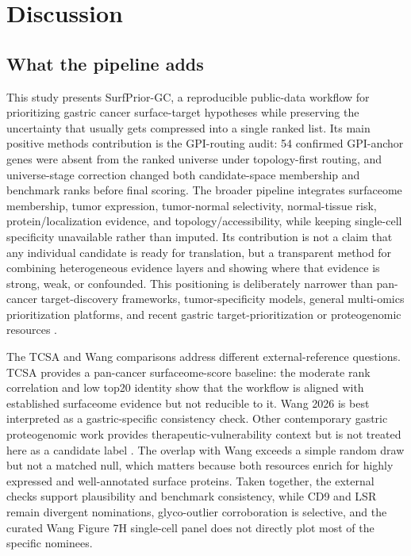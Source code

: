 \documentclass[review,12pt,authoryear]{elsarticle}
\begin{document}
\FloatBarrier
\section{Discussion}

\subsection{What the pipeline adds}

This study presents SurfPrior-GC, a reproducible public-data workflow for prioritizing gastric cancer surface-target hypotheses while preserving the uncertainty that usually gets compressed into a single ranked list. Its main positive methods contribution is the GPI-routing audit: 54 confirmed GPI-anchor genes were absent from the ranked universe under topology-first routing, and universe-stage correction changed both candidate-space membership and benchmark ranks before final scoring. The broader pipeline integrates surfaceome membership, tumor expression, tumor-normal selectivity, normal-tissue risk, protein/\allowbreak{}localization evidence, and topology/\allowbreak{}accessibility, while keeping single-cell specificity unavailable rather than imputed. Its contribution is not a claim that any individual candidate is ready for translation, but a transparent method for combining heterogeneous evidence layers and showing where that evidence is strong, weak, or confounded. This positioning is deliberately narrower than pan-cancer target-discovery frameworks, tumor-specificity models, general multi-omics prioritization platforms, and recent gastric target-prioritization or proteogenomic resources \citep{li2022pancancer,razzaghdoust2021adc,kathad2024adc,deng2024multiomics2targets,moek2017adc_landscape,li2024bayests,xu2025gastric_targets,chang2026gastric_proteogenomics}.

The TCSA and Wang comparisons address different external-reference questions. TCSA provides a pan-cancer surfaceome-score baseline: the moderate rank correlation and low top20 identity show that the workflow is aligned with established surfaceome evidence but not reducible to it. Wang 2026 is best interpreted as a gastric-specific consistency check. Other contemporary gastric proteogenomic work provides therapeutic-vulnerability context but is not treated here as a candidate label \citep{chang2026gastric_proteogenomics}. The overlap with Wang exceeds a simple random draw but not a matched null, which matters because both resources enrich for highly expressed and well-annotated surface proteins. Taken together, the external checks support plausibility and benchmark consistency, while CD9 and LSR remain divergent nominations, glyco-outlier corroboration is selective, and the curated Wang Figure 7H single-cell panel does not directly plot most of the specific nominees.
\end{document}
